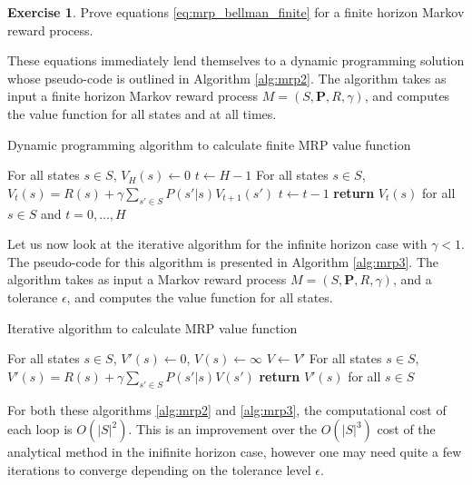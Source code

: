 \documentclass{article}
\theoremstyle{definition}
\newtheorem{exercise}{Exercise}[section]
\theoremstyle{remark}
\begin{document}
\begin{exercise}
Prove equations \eqref{eq:mrp_bellman_finite} for a finite horizon Markov reward process.
\label{ex-bellman-finite}
\end{exercise}

These equations immediately lend themselves to a dynamic programming solution whose pseudo-code is outlined in Algorithm \ref{alg:mrp2}. The algorithm takes as input a finite horizon Markov reward process $M = (S,\mathbf{P},R,\gamma)$, and computes the value function for all states and at all times.

\begin{algorithm}
\caption{Dynamic programming algorithm to calculate finite MRP value function}\label{alg:mrp2}
\begin{algorithmic}[1]
\State For all states $s \in S$, $V_H(s)\gets 0$
\State $t\gets H-1$
\State For all states $s \in S$, $V_t(s) = R(s) + \gamma \sum_{s' \in S} P(s'|s)V_{t+1}(s')$
\State $t\gets t - 1$
\EndWhile\label{mrp2label}
\State \textbf{return} $V_t(s)$ for all $s \in S$ and $t = 0,\dots,H$
\EndProcedure
\end{algorithmic}
\end{algorithm}

Let us now look at the iterative algorithm for the infinite horizon case with $\gamma < 1$. The pseudo-code for this algorithm is presented in Algorithm \ref{alg:mrp3}. The algorithm takes as input a Markov reward process $M = (S,\mathbf{P},R,\gamma)$, and a tolerance $\epsilon$, and computes the value function for all states.

\begin{algorithm}
\caption{Iterative algorithm to calculate MRP value function}\label{alg:mrp3}
\begin{algorithmic}[1]
\State For all states $s \in S$, $V'(s)\gets 0$, $V(s) \gets \infty$
\State $V \gets V'$
\State For all states $s \in S$, $V'(s) = R(s) + \gamma \sum_{s' \in S} P(s'|s)V(s')$
\EndWhile\label{mrp3label}
\State \textbf{return} $V'(s)$ for all $s \in S$
\EndProcedure
\end{algorithmic}
\end{algorithm}

For both these algorithms \ref{alg:mrp2} and \ref{alg:mrp3}, the computational cost of each loop is $O(|S|^2)$. This is an improvement over the $O(|S|^3)$ cost of the analytical method in the inifinite horizon case, however one may need quite a few iterations to converge depending on the tolerance level $\epsilon$.
\end{document}
